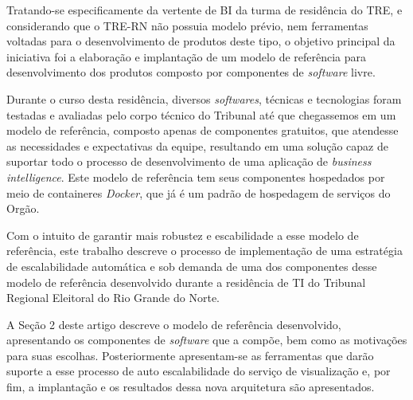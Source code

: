 Tratando-se especificamente da vertente de BI da turma de residência do TRE, e considerando que o TRE-RN não possuia modelo prévio, nem ferramentas voltadas para o desenvolvimento de produtos deste tipo, o objetivo principal da iniciativa foi a elaboração e implantação de um modelo de referência para desenvolvimento dos produtos composto por componentes de \textit{software} livre. 

Durante o curso desta residência, diversos \textit{softwares}, técnicas e tecnologias foram testadas e avaliadas pelo corpo técnico do Tribunal até que chegassemos em um modelo de referência, composto apenas de componentes gratuitos, que atendesse as necessidades e expectativas da equipe, resultando em uma solução capaz de suportar todo o processo de desenvolvimento de uma aplicação de \textit{business intelligence}. Este modelo de referência tem seus componentes hospedados por meio de containeres \textit{Docker}, que já é um padrão de hospedagem de serviços do Orgão.

Com o intuito de garantir mais robustez e escabilidade a esse modelo de referência, este trabalho descreve o processo de implementação de uma estratégia de escalabilidade automática e sob demanda de uma dos componentes desse modelo de referência desenvolvido durante a residência de TI do Tribunal Regional Eleitoral do Rio Grande do Norte.  

A Seção 2 deste artigo descreve o modelo de referência desenvolvido, apresentando os componentes de \textit{software} que a compõe, bem como as motivações para suas escolhas. Posteriormente apresentam-se as ferramentas que darão suporte a esse processo de auto escalabilidade do serviço de visualização e, por fim, a implantação e os resultados dessa nova arquitetura são apresentados.